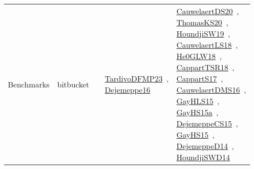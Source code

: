 {\begin{longtable}{lp{3cm}>{\raggedright\arraybackslash}p{6cm}>{\raggedright\arraybackslash}p{6cm}>{\raggedright\arraybackslash}p{8cm}}
Benchmarks & bitbucket &  & \href{works/TardivoDFMP23.pdf}{TardivoDFMP23}~\cite{TardivoDFMP23}, \href{works/Dejemeppe16.pdf}{Dejemeppe16}~\cite{Dejemeppe16} & \href{works/CauwelaertDS20.pdf}{CauwelaertDS20}~\cite{CauwelaertDS20}, \href{works/ThomasKS20.pdf}{ThomasKS20}~\cite{ThomasKS20}, \href{works/HoundjiSW19.pdf}{HoundjiSW19}~\cite{HoundjiSW19}, \href{works/CauwelaertLS18.pdf}{CauwelaertLS18}~\cite{CauwelaertLS18}, \href{works/He0GLW18.pdf}{He0GLW18}~\cite{He0GLW18}, \href{works/CappartTSR18.pdf}{CappartTSR18}~\cite{CappartTSR18}, \href{works/CappartS17.pdf}{CappartS17}~\cite{CappartS17}, \href{works/CauwelaertDMS16.pdf}{CauwelaertDMS16}~\cite{CauwelaertDMS16}, \href{works/GayHLS15.pdf}{GayHLS15}~\cite{GayHLS15}, \href{works/GayHS15a.pdf}{GayHS15a}~\cite{GayHS15a}, \href{works/DejemeppeCS15.pdf}{DejemeppeCS15}~\cite{DejemeppeCS15}, \href{works/GayHS15.pdf}{GayHS15}~\cite{GayHS15}, \href{works/DejemeppeD14.pdf}{DejemeppeD14}~\cite{DejemeppeD14}, \href{works/HoundjiSWD14.pdf}{HoundjiSWD14}~\cite{HoundjiSWD14}\\

\end{longtable}}

